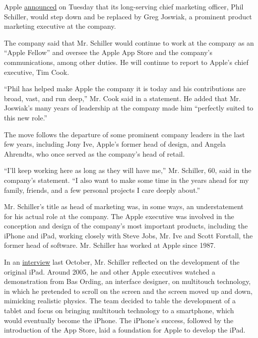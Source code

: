 Apple
\href{https://www.apple.com/newsroom/2020/08/phil-schiller-advances-to-apple-fellow/}{announced}
on Tuesday that its long-serving chief marketing officer, Phil Schiller,
would step down and be replaced by Greg Joswiak, a prominent product
marketing executive at the company.

The company said that Mr. Schiller would continue to work at the company
as an ``Apple Fellow'' and oversee the Apple App Store and the company's
communications, among other duties. He will continue to report to
Apple's chief executive, Tim Cook.

``Phil has helped make Apple the company it is today and his
contributions are broad, vast, and run deep,'' Mr. Cook said in a
statement. He added that Mr. Joswiak's many years of leadership at the
company made him ``perfectly suited to this new role.''

The move follows the departure of some prominent company leaders in the
last few years, including Jony Ive, Apple's former head of design, and
Angela Ahrendts, who once served as the company's head of retail.

``I'll keep working here as long as they will have me,'' Mr. Schiller,
60, said in the company's statement. ``I also want to make some time in
the years ahead for my family, friends, and a few personal projects I
care deeply about.''

Mr. Schiller's title as head of marketing was, in some ways, an
understatement for his actual role at the company. The Apple executive
was involved in the conception and design of the company's most
important products, including the iPhone and iPad, working closely with
Steve Jobs, Mr. Ive and Scott Forstall, the former head of software. Mr.
Schiller has worked at Apple since 1987.

In an
\href{https://www.nytimes3xbfgragh.onion/interactive/2019/12/15/technology/decade-in-tech.html}{interview}
last October, Mr. Schiller reflected on the development of the original
iPad. Around 2005, he and other Apple executives watched a demonstration
from Bas Ording, an interface designer, on multitouch technology, in
which he pretended to scroll on the screen and the screen moved up and
down, mimicking realistic physics. The team decided to table the
development of a tablet and focus on bringing multitouch technology to a
smartphone, which would eventually become the iPhone. The iPhone's
success, followed by the introduction of the App Store, laid a
foundation for Apple to develop the iPad.

